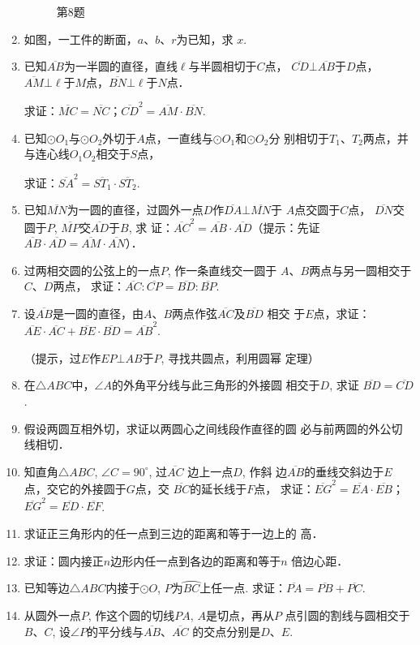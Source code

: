 \begin{enumerate}
\begin{figure}[htp]
\begin{minipage}[t]{0.48\textwidth}
\begin{tikzpicture}[>=latex, scale=1.5]
    \end{tikzpicture}
    \caption*{第8题}
    \end{minipage}
    \end{figure}

\item 如图，一工件的断面，$a$、$b$、$r$为已知，求
$x$.
\item 已知$\overline{AB}$为一半圆的直径，直线$\ell$与半圆相切于$C$点，
$\overline{CD}\bot\overline{AB}$于$D$点，$\overline{AM}\bot \ell$于$M$点，$\overline{BN}\bot \ell$于$N$点．

求证：$\overline{MC}=\overline{NC}$；$\overline{CD}^2=\overline{AM}\cdot \overline{BN}$.

\item 已知$\odot O_1$与$\odot O_2$外切于$A$点，一直线与$\odot O_1$和$\odot O_2$分
别相切于$T_1$、$T_2$两点，并与连心线$O_1O_2$相交于$S$点，

求证：$\overline{SA}^2=\overline{ST_1}\cdot \overline{ST_2}$.
\item 已知$\overline{MN}$为一圆的直径，过圆外一点$D$作$\overline{DA}\bot \overline{MN}$于
$A$点交圆于$C$点，
$\overline{DN}$交圆于$P$, $\overline{MP}$交$\overline{AD}$于$B$, 求
证：$\overline{AC}^2=\overline{AB}\cdot \overline{AD}$（提示：先证$\overline{AB}\cdot \overline{AD}=\overline{AM}\cdot 
\overline{AN}$）．
\item 过两相交圆的公弦上的一点$P$, 作一条直线交一圆于
$A$、$B$两点与另一圆相交于$C$、$D$两点，
求证：$\overline{AC}:\overline{CP}=\overline{BD}:\overline{BP}$.
\item 设$\overline{AB}$是一圆的直径，由$A$、$B$两点作弦$\overline{AC}$及$\overline{BD}$
相交
于$E$点，求证：$\overline{AE}\cdot \overline{AC}+\overline{BE}\cdot \overline{BD}=\overline{AB}^2$.

（提示，过$E$作$EP\bot AB$于$P$, 寻找共圆点，利用圆幂
定理）
\item 在$\triangle ABC$中，$\angle A$的外角平分线与此三角形的外接圆
相交于$D$, 求证 $\overline{BD}=\overline{CD}$.
\item 假设两圆互相外切，求证以两圆心之间线段作直径的圆
必与前两圆的外公切线相切．
\item 知直角$\triangle ABC$, $\angle C=90^{\circ}$, 过$\overline{AC}$
边上一点$D$, 作斜
边$\overline{AB}$的垂线交斜边于$E$点，交它的外接圆于$G$点，交
$\overline{BC}$的延长线于$F$点，
求证：$\overline{EG}^2=\overline{EA}\cdot \overline{EB}$；$\overline{EG}^2=\overline{ED}\cdot \overline{EF}$.
\item 求证正三角形内的任一点到三边的距离和等于一边上的
高．
\item 求证：圆内接正$n$边形内任一点到各边的距离和等于$n$
倍边心距．
\item 已知等边$\triangle ABC$内接于$\odot O$, $P$为$\wideparen{BC}$上任一点. 
求证：$\overline{PA}=\overline{PB}+\overline{PC}$.
\item 从圆外一点$P$, 作这个圆的切线$PA$, $A$是切点，再从$P$
点引圆的割线与圆相交于$B$、$C$, 设$\angle P$的平分线与$\overline{AB}$、$\overline{AC}$
的交点分别是$D$、$E$. 


\end{enumerate}
